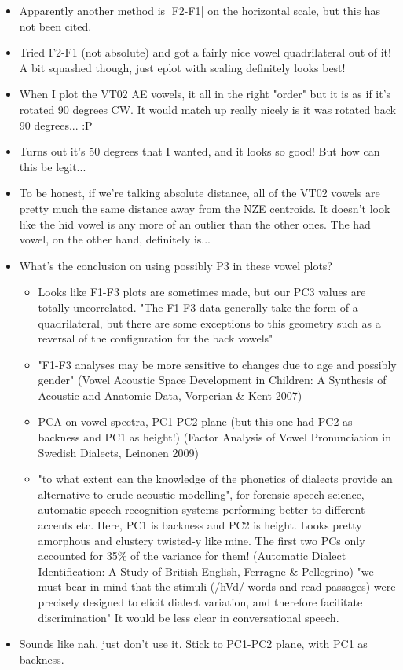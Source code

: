 \documentclass{article}
\begin{document}
\begin{itemize}
\begin{itemize}
        \item Apparently another method is |F2-F1| on the horizontal scale, but this has not been cited.
        \item Tried F2-F1 (not absolute) and got a fairly nice vowel quadrilateral out of it! A bit squashed though, just eplot with scaling definitely looks best!
        \item When I plot the VT02 AE vowels, it all in the right "order" but it is as if it's rotated 90 degrees CW. It would match up really nicely is it was rotated back 90 degrees... :P
        \item Turns out it's 50 degrees that I wanted, and it looks so good! But how can this be legit...
        \item To be honest, if we're talking absolute distance, all of the VT02 vowels are pretty much the same distance away from the NZE centroids. It doesn't look like the hid vowel is any more of an outlier than the other ones. The had vowel, on the other hand, definitely is...
        \item What's the conclusion on using possibly P3 in these vowel plots?
        \begin{itemize}
            \item Looks like F1-F3 plots are sometimes made, but our PC3 values are totally uncorrelated. "The F1-F3 data generally take the form of a quadrilateral, but there are some exceptions to this geometry such as a reversal of the configuration for the back vowels" 
            \item "F1-F3 analyses may be more sensitive to changes due to age and possibly gender" (Vowel Acoustic Space Development in Children: A Synthesis of Acoustic and Anatomic Data, Vorperian \& Kent 2007)
            \item PCA on vowel spectra, PC1-PC2 plane (but this one had PC2 as backness and PC1 as height!) (Factor Analysis of Vowel Pronunciation in Swedish Dialects, Leinonen 2009)
            \item "to what extent can the knowledge of the phonetics of dialects provide an alternative to crude acoustic modelling", for forensic speech science, automatic speech recognition systems performing better to different accents etc. Here, PC1 is backness and PC2 is height. Looks pretty amorphous and clustery twisted-y like mine. The first two PCs only accounted for 35\% of the variance for them! (Automatic Dialect Identification: A Study of British English, Ferragne \& Pellegrino) "we must bear in mind that the stimuli (/hVd/ words and read
passages) were precisely designed to elicit dialect variation, and therefore facilitate discrimination" It would be less clear in conversational speech.
        \end{itemize}
        \item Sounds like nah, just don't use it. Stick to PC1-PC2 plane, with PC1 as backness.
    \end{itemize}
\end{itemize}
\end{document}
